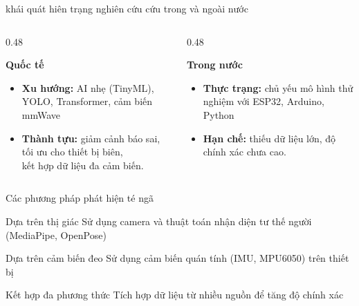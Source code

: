 


\begin{frame}{khái quát hiên trạng nghiên cứu cứu trong và ngoài nước}
\small
\begin{columns}[T,onlytextwidth]
    \begin{column}{0.48\textwidth}
        \begin{block}{\textbf{Quốc tế}}
            \begin{itemize}
                \item \textbf{Xu hướng:} AI nhẹ (TinyML), YOLO, Transformer, cảm biến mmWave
                \item \textbf{Thành tựu:} giảm cảnh báo sai, tối ưu cho thiết bị biên, \\
                      kết hợp dữ liệu đa cảm biến. 
            \end{itemize}
        \end{block}
    \end{column}

    \begin{column}{0.48\textwidth}
        \begin{block}{\textbf{Trong nước}}
            \begin{itemize}
                \item \textbf{Thực trạng:} chủ yếu mô hình thử nghiệm với ESP32, Arduino, Python
                \item \textbf{Hạn chế:} thiếu dữ liệu lớn, độ chính xác chưa cao.
            \end{itemize}
        \end{block}
    \end{column}
\end{columns}
\end{frame}


\begin{frame}{Các phương pháp phát hiện té ngã}

\begin{block}{Dựa trên thị giác }
    Sử dụng camera và thuật toán nhận diện tư thế người (MediaPipe, OpenPose)
\end{block}

\begin{block}{Dựa trên cảm biến đeo}
    Sử dụng cảm biến quán tính (IMU, MPU6050) trên thiết bị
\end{block}

\begin{block}{Kết hợp đa phương thức}
    Tích hợp dữ liệu từ nhiều nguồn để tăng độ chính xác
\end{block}
\end{frame}


